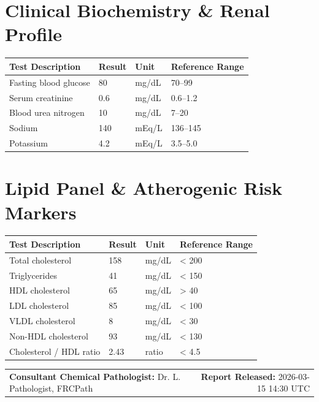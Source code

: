 \documentclass[10pt,a4paper]{article}
\begin{document}
\vspace{8pt}

\section*{Clinical Biochemistry \& Renal Profile}

\begin{tabular}{@{} p{6.4cm} p{2.5cm} p{2.5cm} p{3.1cm} @{}}
  \toprule
  \textbf{Test Description} & \textbf{Result} & \textbf{Unit} & \textbf{Reference Range} \\
  \midrule
  Fasting blood glucose & 80 & mg/dL & 70--99 \\
  Serum creatinine & 0.6 & mg/dL & 0.6--1.2 \\
  Blood urea nitrogen & 10 & mg/dL & 7--20 \\
  Sodium & 140 & mEq/L & 136--145 \\
  Potassium & 4.2 & mEq/L & 3.5--5.0 \\
  \bottomrule
\end{tabular}

\vspace{8pt}

\section*{Lipid Panel \& Atherogenic Risk Markers}

\begin{tabular}{@{} p{6.4cm} p{2.5cm} p{2.5cm} p{3.1cm} @{}}
  \toprule
  \textbf{Test Description} & \textbf{Result} & \textbf{Unit} & \textbf{Reference Range} \\
  \midrule
  Total cholesterol & 158 & mg/dL & < 200 \\
  Triglycerides & 41 & mg/dL & < 150 \\
  HDL cholesterol & 65 & mg/dL & > 40 \\
  LDL cholesterol & 85 & mg/dL & < 100 \\
  VLDL cholesterol & 8 & mg/dL & < 30 \\
  Non-HDL cholesterol & 93 & mg/dL & < 130 \\
  Cholesterol / HDL ratio & 2.43 & ratio & < 4.5 \\
  \bottomrule
\end{tabular}

\vspace{14pt}

\noindent
\begin{tabular*}{\textwidth}{@{} l @{\extracolsep{\fill}} r @{}}
  \textbf{Consultant Chemical Pathologist:} Dr. L. Pathologist, FRCPath & \textbf{Report Released:} 2026-03-15 14:30 UTC \\
\end{tabular*}
\end{document}
